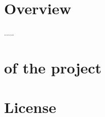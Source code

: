 \hypertarget{index_Overview}{}\section{Overview}\label{index_Overview}
..... \hypertarget{index_Purpose}{}\section{of the project}\label{index_Purpose}
\hypertarget{mainpage.txt_License}{}\section{License}\label{mainpage.txt_License}

